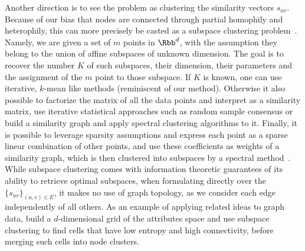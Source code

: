 Another direction is to see the problem as clustering the similarity vectors $s_{uv}$. Because of
our bias that nodes are connected through partial homophily and heterophily, this can more precisely
be casted as a subspace clustering problem~\autocite{SCSurvey11}. Namely, we are given a set of $m$
points in $\Rbb^d$, with the assumption they belong to the union of affine subspaces of unknown
dimension. The goal is to recover the number $K$ of such subspaces, their dimension, their
parameters and the assignment of the $m$ point to those subspace. If $K$ is known, one can use
iterative, $k$-mean like methods (reminiscent of our \lloyd{} method). Otherwise it also possible to
factorize the matrix of all the data points and interpret as a similarity matrix, use iterative
statistical approaches such as random sample consensus or build a similarity graph and apply
spectral clustering algorithms to it. Finally, it is possible to leverage sparsity assumptions and
express each point as a sparse linear combination of other points, and use these coefficients as
weights of a similarity graph, which is then clustered into subspaces by a spectral
method~\autocite{SparseSC13}.
While subspace clustering comes with information theoretic guarantees of its ability to retrieve
optimal subspaces, when formulating directly over the $\{s_{uv}\}_{(u,v) \in E}$, it makes no use of
graph topology, as we consider each edge independently of all others. As an example of applying
related ideas to graph data, \textcite{Huang2015} build a $d$-dimensional grid of the attributes
space and use subspace clustering to find cells that have low entropy and high connectivity, before
merging such cells into node clusters.



